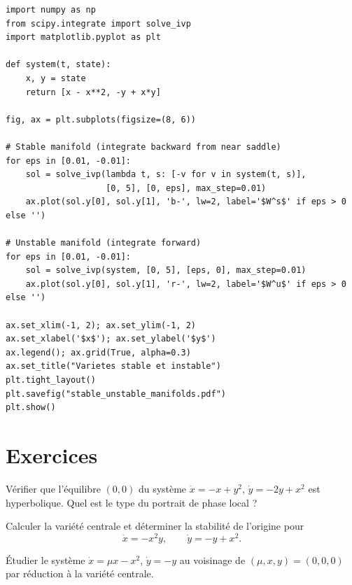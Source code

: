 \begin{codeblock}[title=\textbf{Vari\'et\'es stable et instable du col}]
\begin{verbatim}
import numpy as np
from scipy.integrate import solve_ivp
import matplotlib.pyplot as plt

def system(t, state):
    x, y = state
    return [x - x**2, -y + x*y]

fig, ax = plt.subplots(figsize=(8, 6))

# Stable manifold (integrate backward from near saddle)
for eps in [0.01, -0.01]:
    sol = solve_ivp(lambda t, s: [-v for v in system(t, s)],
                    [0, 5], [0, eps], max_step=0.01)
    ax.plot(sol.y[0], sol.y[1], 'b-', lw=2, label='$W^s$' if eps > 0 else '')

# Unstable manifold (integrate forward)
for eps in [0.01, -0.01]:
    sol = solve_ivp(system, [0, 5], [eps, 0], max_step=0.01)
    ax.plot(sol.y[0], sol.y[1], 'r-', lw=2, label='$W^u$' if eps > 0 else '')

ax.set_xlim(-1, 2); ax.set_ylim(-1, 2)
ax.set_xlabel('$x$'); ax.set_ylabel('$y$')
ax.legend(); ax.grid(True, alpha=0.3)
ax.set_title("Varietes stable et instable")
plt.tight_layout()
plt.savefig("stable_unstable_manifolds.pdf")
plt.show()
\end{verbatim}
\end{codeblock}

\section{Exercices}

\begin{exercice}
V\'erifier que l'\'equilibre $(0,0)$ du syst\`eme
$\dot{x} = -x + y^2$, $\dot{y} = -2y + x^2$ est hyperbolique.
Quel est le type du portrait de phase local ?
\end{exercice}

\begin{exercice}
Calculer la vari\'et\'e centrale et d\'eterminer la stabilit\'e de l'origine pour
\[
    \dot{x} = -x^2y, \qquad \dot{y} = -y + x^2.
\]
\end{exercice}

\begin{exercice}
\'Etudier le syst\`eme $\dot{x} = \mu x - x^2$, $\dot{y} = -y$ au voisinage
de $(\mu, x, y) = (0, 0, 0)$ par r\'eduction \`a la vari\'et\'e centrale.
\end{exercice}

